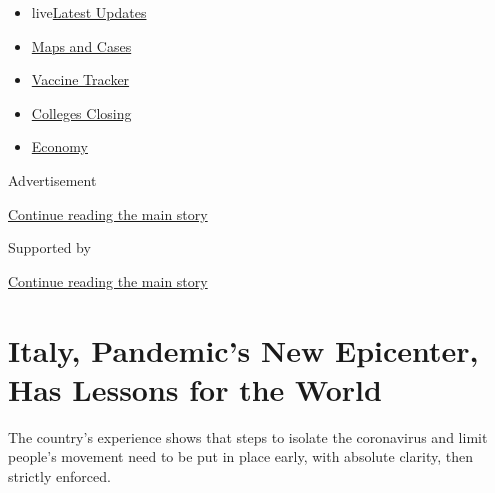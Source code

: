 \begin{itemize}
\tightlist
\item
  live\href{https://www.nytimes3xbfgragh.onion/2020/08/21/world/covid-19-coronavirus.html?name=styln-coronavirus-national\&region=TOP_BANNER\&variant=undefined\&block=storyline_menu_recirc\&action=click\&pgtype=Article\&impression_id=8dcdbcb1-e39e-11ea-9c7b-936aea0939b9}{Latest
  Updates}
\item
  \href{https://www.nytimes3xbfgragh.onion/interactive/2020/us/coronavirus-us-cases.html?name=styln-coronavirus-national\&region=TOP_BANNER\&variant=undefined\&block=storyline_menu_recirc\&action=click\&pgtype=Article\&impression_id=8dcdbcb2-e39e-11ea-9c7b-936aea0939b9}{Maps
  and Cases}
\item
  \href{https://www.nytimes3xbfgragh.onion/interactive/2020/science/coronavirus-vaccine-tracker.html?name=styln-coronavirus-national\&region=TOP_BANNER\&variant=undefined\&block=storyline_menu_recirc\&action=click\&pgtype=Article\&impression_id=8dcdbcb3-e39e-11ea-9c7b-936aea0939b9}{Vaccine
  Tracker}
\item
  \href{https://www.nytimes3xbfgragh.onion/2020/08/19/us/colleges-closing-covid.html?name=styln-coronavirus-national\&region=TOP_BANNER\&variant=undefined\&block=storyline_menu_recirc\&action=click\&pgtype=Article\&impression_id=8dcde3c0-e39e-11ea-9c7b-936aea0939b9}{Colleges
  Closing}
\item
  \href{https://www.nytimes3xbfgragh.onion/live/2020/08/20/business/stock-market-today-coronavirus?name=styln-coronavirus-national\&region=TOP_BANNER\&variant=undefined\&block=storyline_menu_recirc\&action=click\&pgtype=Article\&impression_id=8dcde3c1-e39e-11ea-9c7b-936aea0939b9}{Economy}
\end{itemize}

Advertisement

\protect\hyperlink{after-top}{Continue reading the main story}

Supported by

\protect\hyperlink{after-sponsor}{Continue reading the main story}

\hypertarget{italy-pandemics-new-epicenter-has-lessons-for-the-world}{%
\section{Italy, Pandemic's New Epicenter, Has Lessons for the
World}\label{italy-pandemics-new-epicenter-has-lessons-for-the-world}}

The country's experience shows that steps to isolate the coronavirus and
limit people's movement need to be put in place early, with absolute
clarity, then strictly enforced.

